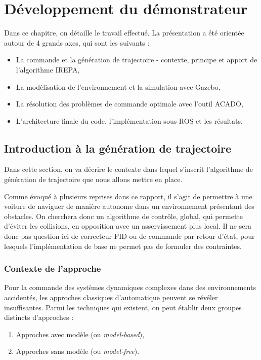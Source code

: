 \documentclass[a4paper,12pt]{report}
\newcommand{\bi}{\begin{itemize}}
\newcommand{\ei}{\end{itemize}}
\newcommand{\itemo}{\item[\textsf{o}]}
\begin{document}

\chapter{Développement du démonstrateur}

Dans ce chapitre, on détaille le travail effectué. La présentation a été orientée autour de 4 grands axes, qui sont les suivants :

\bi
\itemo La commande et la génération de trajectoire - contexte, principe et apport de l'algorithme IREPA,
\itemo La modélisation de l'environnement et la simulation avec Gazebo,
\itemo La résolution des problèmes de commande optimale avec l'outil ACADO,
\itemo L'architecture finale du code, l'implémentation sous ROS et les résultats.
\ei




\section{Introduction à la génération de trajectoire}
Dans cette section, on va décrire le contexte dans lequel s'inscrit l'algorithme de génération de trajectoire que nous allons mettre en place.

Comme évoqué à plusieurs reprises dans ce rapport, il s'agit de permettre à une voiture de naviguer de manière autonome dans un environnement présentant des obstacles. On cherchera donc un algorithme de contrôle, global, qui permette d'éviter les collisions, en opposition avec un asservissement plus local. Il ne sera donc pas question ici de correcteur PID ou de commande par retour d'état, pour lesquels l'implémentation de base ne permet pas de formuler des contraintes.

\subsection{Contexte de l'approche}
Pour la commande des systèmes dynamiques complexes dans des environnements accidentés, les approches classiques d'automatique peuvent se révéler insuffisantes. Parmi les techniques qui existent, on peut établir deux groupes distincts d'approches :

\begin{enumerate}
	\item Approches avec modèle (ou \textit{model-based}),
	\item Approches sans modèle (ou \textit{model-free}).
\end{enumerate}
\end{document}
